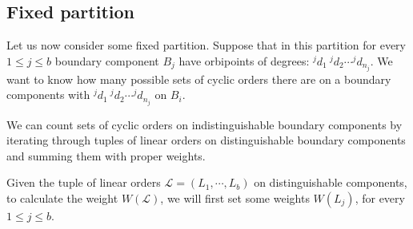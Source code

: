 \subsection{Fixed partition}
Let us now consider some fixed partition.
Suppose that in this partition for every $1\leq j \leq b$
boundary component $B_j$ have orbipoints of degrees: 
$^jd_1\ ^jd_2\cdots ^jd_{n_j}$.  
We want to know how many possible sets of cyclic orders there are on a boundary components with 
$^jd_1\ ^jd_2\cdots ^jd_{n_j}$ on $B_i$. 



We can count sets of cyclic orders on indistinguishable boundary components 
by iterating through tuples of 
linear orders on distinguishable boundary components and summing them with proper weights. 

Given the tuple of linear orders $\mathcal{L} = (L_1, \cdots, L_b)$ on
distinguishable components, to calculate 
the weight $W(\mathcal{L})$, we will first set some weights $W(L_j)$, for every 
$1\leq j \leq b$. 

